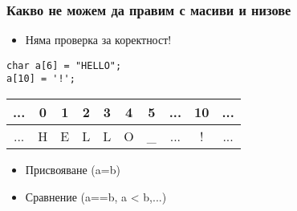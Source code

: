 \documentclass{beamer}
\begin{document}
\begin{frame}[fragile]
\frametitle{Какво не можем да правим с масиви и низове}

\begin{itemize}
  \item Няма проверка за коректност!
\end{itemize}

\begin{flushleft}
\begin{lstlisting}
char a[6] = "HELLO";
a[10] = '!';
\end{lstlisting}


\begin{tabular}{c | c | c | c | c | c | c | c | c | c}
\hline
...&0 &1 &2 &3 &4 &5   &...&10&... \\\hline
...&H &E &L &L &O & \_ &...&\alert{!}& ... \\\hline
\end{tabular}
\end{flushleft}

\pause

\begin{itemize}
  \item Присвояване (a=b)
  \pause
  \item Сравнение (a==b, a < b,...)
\end{itemize}

\end{frame}
\end{document}
